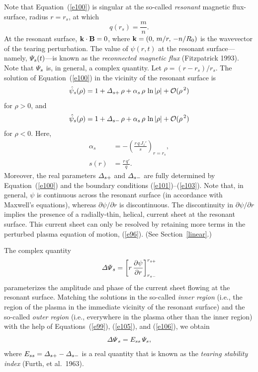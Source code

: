 \documentclass[notitlepage,12pt]{article}
\begin{document}
Note that Equation~(\ref{e100}) is singular at the so-called {\em resonant}\/ magnetic flux-surface, radius $r=r_s$, at which 
\begin{equation}\label{e104}
q(r_s)= \frac{m}{n}.
\end{equation}
At the resonant surface, ${\bf k}\cdot{\bf B}=0$, where ${\bf k} = (0,\,m/r,\,-n/R_0)$ is the wavevector of the tearing perturbation. 
The value of $\psi(r,t)$ at the resonant surface---namely, ${\mit\Psi}_s(t)$---is known as the {\em reconnected magnetic flux}\/ (Fitzpatrick 1993). 
Note that ${\mit\Psi}_s$ is, in general, a complex quantity. 
Let $\rho=(r-r_s)/r_s$. 
The solution of Equation~(\ref{e100}) in the vicinity of the resonant surface is
\begin{equation}\label{e105}
\hat{\psi}_s(\rho) = 1 + {\mit\Delta}_{s+}\,\rho + \alpha_s\,\rho\,\ln|\rho| + {\cal O}(\rho^{\,2})
\end{equation}
for $\rho>0$, and
\begin{equation}\label{e106}
\hat{\psi}_s(\rho) = 1 + {\mit\Delta}_{s-}\,\rho + \alpha_s\,\rho\,\ln|\rho| + {\cal O}(\rho^{\,2})
\end{equation}
for $\rho<0$. Here, 
\begin{align}
\alpha_s& =- \left(\frac{r\,q\,J_z'}{s}\right)_{r=r_s},\\[0.5ex]
s(r) &= \frac{r\,q'}{q}.\label{shear}
\end{align}
Moreover,  the real parameters ${\mit\Delta}_{s+}$ and  ${\mit\Delta}_{s-}$ are fully determined by Equation~(\ref{e100})
and the boundary conditions (\ref{e101})--(\ref{e103}). Note that, in general, $\psi$ is continuous across the resonant surface (in accordance with Maxwell's equations),
whereas $\partial\psi/\partial r$ is discontinuous. The discontinuity in $\partial \psi/\partial r$ implies the presence of a radially-thin, helical,  current sheet  at the resonant surface. This current sheet can only be resolved by retaining more terms in the perturbed plasma equation of motion, (\ref{e96}). (See Section~\ref{linear}.) 

The complex quantity
\begin{equation}\label{e109}
{\mit\Delta\Psi}_s = \left[r\,\frac{\partial \psi}{\partial r}\right]_{r_{s-}}^{r_{s+}}
\end{equation}
parameterizes the amplitude and phase of the current sheet flowing at the resonant surface. Matching the solutions
in the so-called {\em inner region}\/ (i.e., the region of the plasma in the immediate vicinity of the resonant surface)
and the so-called {\em outer region}\/ (i.e., everywhere in the plasma other than the inner region) with the help
of Equations~(\ref{e99}), (\ref{e105}), and (\ref{e106}), we obtain
\begin{equation}\label{e110}
{\mit\Delta\Psi}_s = E_{ss}\,{\mit\Psi}_s,
\end{equation}
where $E_{ss}= {\mit\Delta}_{s+}-{\mit\Delta}_{s-}$ is a real quantity that is known as the {\em tearing stability index}\/ (Furth, et al.\ 1963). 
\end{document}

